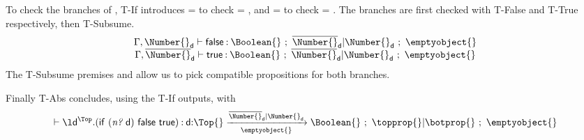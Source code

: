 To check the branches of {},
T-If
introduces  = 
to check  = {\false{}},
and  = 
to check 
 = \true{}.
%
The branches are first checked with T-False and T-True respectively,
then T-Subsume.
$$
\begin{array}{c}
\judgementselfrewrite{\propenv{},{\isprop{\Number{}}{\makelocal{d}}}}
  {\false{}}
  {\Boolean{}}
  {\filterset{\notprop{\Number{}}{\makelocal{d}}}
             {\isprop{\Number{}}{\makelocal{d}}}}
  {\emptyobject{}}
  \\
\judgementselfrewrite{\propenv{},{\notprop{\Number{}}{\makelocal{d}}}}
  {\true{}}
  {\Boolean{}}
  {\filterset{\notprop{\Number{}}{\makelocal{d}}}
             {\isprop{\Number{}}{\makelocal{d}}}}
  {\emptyobject{}}
\end{array}
$$
%
The T-Subsume premises
\inpropenv {\propenv{}, {\thenprop {\prop{}}}} {\thenprop {\propp{}}}
and
\inpropenv {\propenv{}, {\elseprop {\prop{}}}} {\elseprop {\propp{}}}
allow us to pick compatible propositions for both branches.

Finally T-Abs concludes, using the T-If outputs, with
$$
{\judgementselfrewrite{}{\abs{\makelocal{d}}{\Top}{\ifexp{\appexp{\numberhuh{}}{\makelocal{d}}}{\false{}}{\true{}}}}
                    {\ArrowOne {\makelocal{d}} {\Top{}}
                                      {\Boolean{}}
                                      {\filterset {\notprop{\Number{}}{\makelocal{d}}}
                                                  {\isprop{\Number{}}{\makelocal{d}}}}
                                      {\emptyobject{}}}
                    {\filterset {\topprop{}}
                                {\botprop{}}}
                    {\emptyobject{}}}
$$




